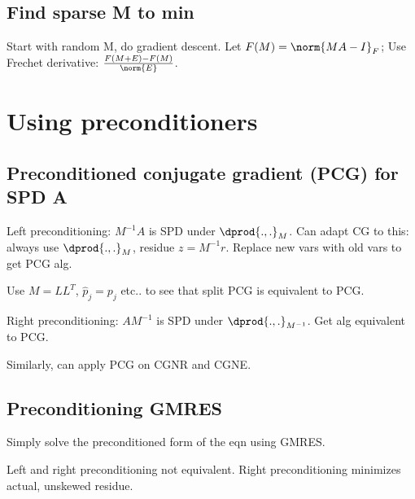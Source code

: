 \documentclass[oneside, article]{memoir}
\begin{document}
\tbc

\subsection{Find sparse M to min }
Start with random M, do gradient descent. Let $F(M) = \norm{MA-I}_{F}$; Use Frechet derivative: $\frac{F(M+E) - F(M)}{\norm{E}}$.

\tbc

\section{Using preconditioners}
\subsection{Preconditioned conjugate gradient (PCG) for SPD A}
Left preconditioning: $M^{-1}A$ is SPD under $\dprod{.,.}_{M}$. Can adapt CG to this: always use $\dprod{.,.}_{M}$, residue $z = M^{-1}r$. Replace new vars with old vars to get PCG alg.

Use $M=LL^{T}$, $\hat{p}_{j} = p_{j}$ etc.. to see that split PCG is equivalent to PCG.

Right preconditioning: $AM^{-1}$ is SPD under $\dprod{.,.}_{M^{-1}}$. Get alg equivalent to PCG.

Similarly, can apply PCG on CGNR and CGNE.

\subsection{Preconditioning GMRES}
Simply solve the preconditioned form of the eqn using GMRES.

Left and right preconditioning not equivalent. Right preconditioning minimizes actual, unskewed residue.



\end{document}
